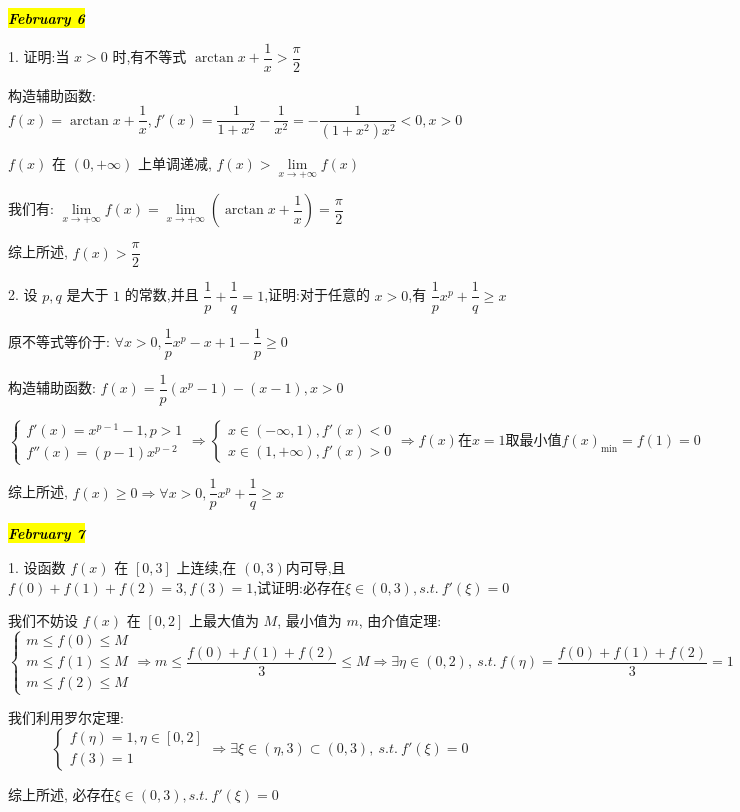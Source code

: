 \hl{\textbf{\textit{February 6}}}

1. 证明:当 $x>0$ 时,有不等式 $\arctan x+\dfrac{1}{x}>\dfrac{\pi}{2}$
\begin{solution}

	构造辅助函数: $f(x) = \arctan x +\dfrac{1}{x}, f'(x) = \dfrac{1}{1+x^{2}}-\dfrac{1}{x^{2}} = -\dfrac{1}{(1+x^{2})x^{2}} < 0, x>0$

	$f(x)$ 在 $(0,+\infty)$ 上单调递减, $f(x) > \lim\limits_{x\to +\infty}f(x)$

	我们有: $\lim\limits_{x\to +\infty}f(x) = \lim\limits_{x\to +\infty}(\arctan x +\dfrac{1}{x}) =\dfrac{\pi}{2}$

	综上所述, $f(x) > \dfrac{\pi}{2}$
\end{solution}

2. 设 $p,q$ 是大于 $1$ 的常数,并且 $\dfrac{1}{p}+\dfrac{1}{q}=1$,证明:对于任意的 $x>0$,有 $\dfrac{1}{p}x^{p}+\dfrac{1}{q}\geq x$
\begin{solution}

	原不等式等价于: $\forall x > 0, \dfrac{1}{p}x^{p} -x +1-\dfrac{1}{p} \geq 0$
	
	构造辅助函数: $f(x) = \dfrac{1}{p}(x^{p}-1) - (x-1), x > 0$

	$$\begin{cases}
		f'(x) = x^{p-1}-1, p > 1\\
		f''(x) = (p-1)x^{p-2}
	\end{cases}\Rightarrow 
	\begin{cases}
		x\in (-\infty,1), f'(x) < 0\\
		x\in(1,+\infty), f'(x) > 0
	\end{cases}\Rightarrow f(x)\text{在} x=1\text{取最小值} f(x)_{\min} = f(1) =0$$

	综上所述, $f(x)\geq 0\Rightarrow \forall x > 0, \dfrac{1}{p}x^{p}+\dfrac{1}{q}\geq x$
\end{solution}

\hl{\textbf{\textit{February 7}}}

1. 设函数 $f(x)$ 在 $[0,3]$ 上连续,在 $(0,3)$内可导,且 $f(0)+f(1)+f(2)=3,f(3)=1$,试证明:必存在$\xi\in(0,3),s.t.\ f'(\xi)=0$
\begin{solution}

	我们不妨设 $f(x)$ 在 $[0,2]$ 上最大值为 $M$, 最小值为 $m$, 由介值定理:
	$$\begin{cases}
		m\leq f(0)\leq M\\
		m\leq f(1)\leq M\\
		m\leq f(2)\leq M
	\end{cases}\Rightarrow m\leq \dfrac{f(0)+f(1)+f(2)}{3}\leq M
	\Rightarrow \exists \eta\in(0,2),\ s.t.\ f(\eta) = \dfrac{f(0)+f(1)+f(2)}{3}=1$$

	我们利用罗尔定理:
	$$\begin{cases} 
		f(\eta) = 1,\eta\in[0,2]\\
		f(3) =1
	\end{cases}\Rightarrow \exists \xi\in(\eta,3)\subset (0,3),\ s.t.\ f'(\xi) = 0$$

	综上所述, 必存在$\xi\in(0,3),s.t.\ f'(\xi)=0$
\end{solution}

